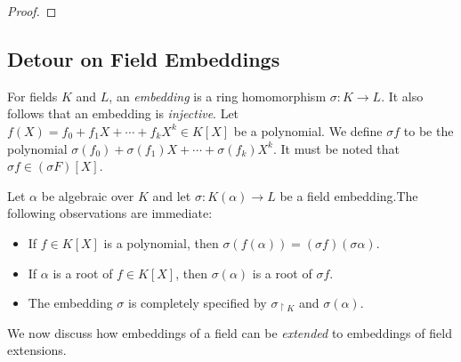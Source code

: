 \documentclass[11pt]{article}
\begin{document}
\begin{proof}
\end{proof}

\subsection{Detour on Field Embeddings}\label{subsec:embeddings}
For fields $K$ and $L$, an {\em embedding} is a ring homomorphism $\sigma: K\rightarrow L$. It also follows that an
embedding is {\em injective}. Let $f(X)=f_0+f_1 X+\cdots+f_k X^k\in K[X]$ be a polynomial. We define $\sigma f$ to be the polynomial
$\sigma(f_0) + \sigma(f_1)X+\cdots + \sigma(f_k)X^k$. It must be noted that $\sigma f\in (\sigma F)[X]$.

Let $\alpha$ be algebraic over $K$ and let $\sigma: K(\alpha)\rightarrow L$ be a field embedding.The
following observations are immediate:
\begin{itemize}[leftmargin=2em]
\item If $f\in K[X]$ is a polynomial, then $\sigma(f(\alpha))=(\sigma f)(\sigma \alpha)$.
\item If $\alpha$ is a root of $f\in K[X]$, then $\sigma(\alpha)$ is a root of $\sigma f$.
\item The embedding $\sigma$ is completely specified by $\sigma_{\restriction K}$ and $\sigma(\alpha)$.
\end{itemize}

We now discuss how embeddings of a field can be {\em extended} to embeddings of field extensions.
\end{document}
